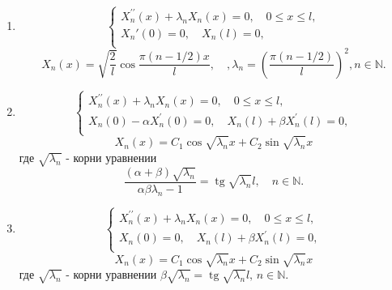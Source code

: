 \documentclass{article}
\begin{document}
\begin{enumerate}
	\item  \begin{equation}
	\left\{\begin{array}{cc}
	X_n^{\prime \prime}(x)+\lambda_nX_n(x)=0,\quad 0\le x\le l,\\
	X_n'(0)=0,\quad X_n(l)=0,\\
	\end{array}\right.
	\end{equation}
	\begin{equation}
	X_n(x)=\sqrt{\frac{2}{l}}\cos\frac{\pi (n-1/2)x}{l},\quad,\lambda_n=\left( \frac{\pi (n-1/2)}{l}\right)^2,n\in\mathbb{N}.
	\end{equation}
	
	\item \begin{equation}
	\left\{\begin{array}{cc}
	X_n^{\prime \prime}(x)+\lambda_nX_n(x)=0,\quad 0\le x\le l,\\
	X_n(0)-\alpha X_n^{\prime}(0)=0,\quad X_n(l)+\beta X_n^{\prime}(l)=0,\\
	\end{array}\right.
	\end{equation}
	\begin{equation}
	X_n(x)=C_1\cos\sqrt{\lambda_n}x+C_2\sin\sqrt{\lambda_n}x
	\end{equation}
	где $\sqrt{\lambda_n}$ - корни уравнении 
	\begin{equation}
	\frac{(\alpha+\beta)\sqrt{\lambda_n}}{\alpha\beta\lambda_n-1}=\operatorname{tg}\sqrt{\lambda_n}l,\quad n\in\mathbb{N}.
	\end{equation}
	
	\item \begin{equation}
	\left\{\begin{array}{cc}
	X_n^{\prime \prime}(x)+\lambda_nX_n(x)=0,\quad 0\le x\le l,\\
	X_n(0)=0,\quad X_n(l)+\beta X_n^{\prime}(l)=0,\\
	\end{array}\right.
	\end{equation}
	\begin{equation}
	X_n(x)=C_1\cos\sqrt{\lambda_n}x+C_2\sin\sqrt{\lambda_n}x
	\end{equation}
	где $\sqrt{\lambda_n}$ - корни уравнении $\beta\sqrt{\lambda_n}=\operatorname{tg}\sqrt{\lambda_n}l,\,n\in\mathbb{N}.$
	

\end{enumerate}
\end{document}
